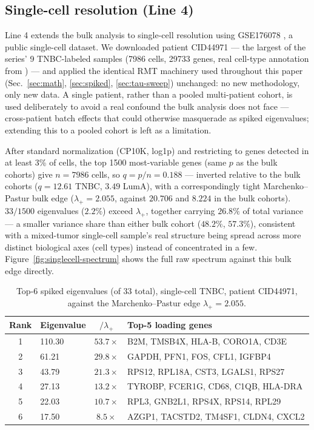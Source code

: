 \documentclass[11pt]{article}
\begin{document}
\subsection{Single-cell resolution (Line 4)}
\label{sec:results-singlecell}

Line 4 extends the bulk analysis to single-cell resolution using
GSE176078 \citep{tnbcsc2021}, a public single-cell dataset. We
downloaded patient CID44971 --- the largest of the series' 9
TNBC-labeled samples (7986 cells, 29733 genes, real cell-type
annotation from \citealp{tnbcsc2021}) --- and applied the identical RMT
machinery used throughout this paper (Sec.~\ref{sec:math},
\ref{sec:spiked}, \ref{sec:tau-sweep}) unchanged: no new methodology,
only new data. A single patient, rather than a pooled multi-patient
cohort, is used deliberately to avoid a real confound the bulk analysis
does not face --- cross-patient batch effects that could otherwise
masquerade as spiked eigenvalues; extending this to a pooled cohort is
left as a limitation.

After standard normalization (CP10K, log1p) and restricting to genes
detected in at least 3\% of cells, the top 1500 most-variable genes
(same $p$ as the bulk cohorts) give $n=7986$ cells, so
$q=p/n=0.188$ --- inverted relative to the bulk cohorts
($q=12.61$ TNBC, $3.49$ LumA), with a correspondingly tight
Marchenko--Pastur bulk edge
($\lambda_+=2.055$, against $20.706$ and $8.224$ in the bulk cohorts).
$33/1500$ eigenvalues ($2.2\%$) exceed $\lambda_+$, together carrying
$26.8\%$ of total variance --- a smaller variance share than either
bulk cohort ($48.2\%$, $57.3\%$), consistent with a mixed-tumor
single-cell sample's real structure being spread across more distinct
biological axes (cell types) instead of concentrated in a few.
Figure~\ref{fig:singlecell-spectrum} shows the full raw spectrum against
this bulk edge directly.

\begin{table}[h]
\centering
\caption{Top-6 spiked eigenvalues (of 33 total), single-cell TNBC,
patient CID44971, against the Marchenko--Pastur edge $\lambda_+=2.055$.}
\label{tab:singlecell-spikes}
\begin{tabular}{clcl}
\toprule
Rank & Eigenvalue & $/\lambda_+$ & Top-5 loading genes \\
\midrule
1 & 110.30 & $53.7\times$ & B2M, TMSB4X, HLA-B, CORO1A, CD3E \\
2 & 61.21  & $29.8\times$ & GAPDH, PFN1, FOS, CFL1, IGFBP4 \\
3 & 43.79  & $21.3\times$ & RPS12, RPL18A, CST3, LGALS1, RPS27 \\
4 & 27.13  & $13.2\times$ & TYROBP, FCER1G, CD68, C1QB, HLA-DRA \\
5 & 22.03  & $10.7\times$ & RPL3, GNB2L1, RPS4X, RPS14, RPL29 \\
6 & 17.50  & $8.5\times$  & AZGP1, TACSTD2, TM4SF1, CLDN4, CXCL2 \\
\bottomrule
\end{tabular}
\end{table}
\end{document}
